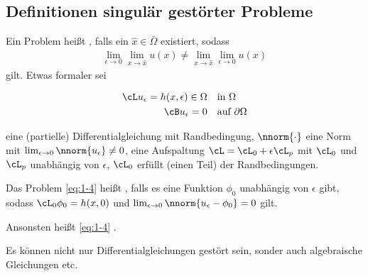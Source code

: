\subsection{Definitionen singulär gestörter Probleme}
\begin{definition}
  Ein Problem heißt , falls ein $\hat x \in \bar \Omega$ existiert, sodass
  \begin{align*}
    \lim_{\epsilon \to 0} \lim_{x \to \hat x} u(x) \neq \lim_{x \to \hat x} \lim_{\epsilon \to 0}  u(x) 
  \end{align*}
gilt. Etwas formaler sei

\begin{align}\label{eq:1-4}
  \cL u_{\epsilon} = h(x, \epsilon) \in \Omega \quad &\text{in } \Omega\\
  \cB u_{\epsilon} = 0 \quad &\text{auf } \partial \Omega \notag
\end{align}


eine (partielle) Differentialgleichung mit Randbedingung,  $\nnorm {\cdot}$ eine Norm mit $\lim_{\epsilon \to 0} \nnorm{u_{\epsilon}} \neq 0$, eine Aufspaltung $\cL = \cL_{0} + \epsilon \cL_{p}$ mit $\cL_{0}$ und $\cL_{p}$ unabhängig von $\epsilon$, $\cL_{0}$ erfüllt (einen Teil) der Randbedingungen. 
\end{definition}
\begin{definition} \label{def:1-2}
  Das Problem \eqref{eq:1-4} heißt , falls es eine Funktion $\phi_{0}$ unabhängig von $\epsilon$ gibt, sodass $\cL_{0}\phi_{0} = h(x, 0)$ und $\lim_{\epsilon\to 0} \nnorm{u_{\epsilon} - \phi_{0}} = 0$ gilt. 

Ansonsten heißt \eqref{eq:1-4} . 
\end{definition}
Es können nicht nur Differentialgleichungen gestört sein, sonder auch algebraische Gleichungen etc.

